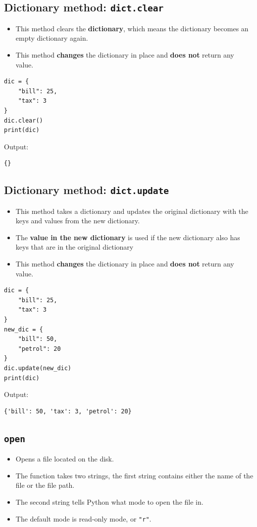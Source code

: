\documentclass[11pt]{article}
\begin{document}
\subsection{Dictionary method: \texttt{dict.clear}}
\label{sec:org26092e4}
\begin{itemize}
\item This method clears the \textbf{dictionary}, which means the dictionary becomes an empty dictionary again.
\item This method \textbf{changes} the dictionary in place and \textbf{does not} return any value.
\end{itemize}
\begin{verbatim}
dic = {
    "bill": 25,
    "tax": 3
}
dic.clear()
print(dic)
\end{verbatim}

 \noindent Output:

\begin{verbatim}
{}
\end{verbatim}

\subsection{Dictionary method: \texttt{dict.update}}
\label{sec:orgf53a52b}
\begin{itemize}
\item This method takes a dictionary and updates the original dictionary with the keys and values from the new dictionary.
\item The \textbf{value in the new dictionary} is used if the new dictionary also has keys that are in the original dictionary
\item This method \textbf{changes} the dictionary in place and \textbf{does not} return any value.
\end{itemize}
\begin{verbatim}
dic = {
    "bill": 25,
    "tax": 3
}
new_dic = {
    "bill": 50,
    "petrol": 20
}
dic.update(new_dic)
print(dic)
\end{verbatim}

 \noindent Output:

\begin{verbatim}
{'bill': 50, 'tax': 3, 'petrol': 20}
\end{verbatim}

\subsection{\texttt{open}}
\label{sec:orgecdf6ad}
\begin{itemize}
\item Opens a file located on the disk.
\item The function takes two strings, the first string contains either the name of the file or the file path.
\item The second string tells Python what mode to open the file in.
\item The default mode is read-only mode, or \texttt{"r"}.
\end{itemize}
\end{document}
